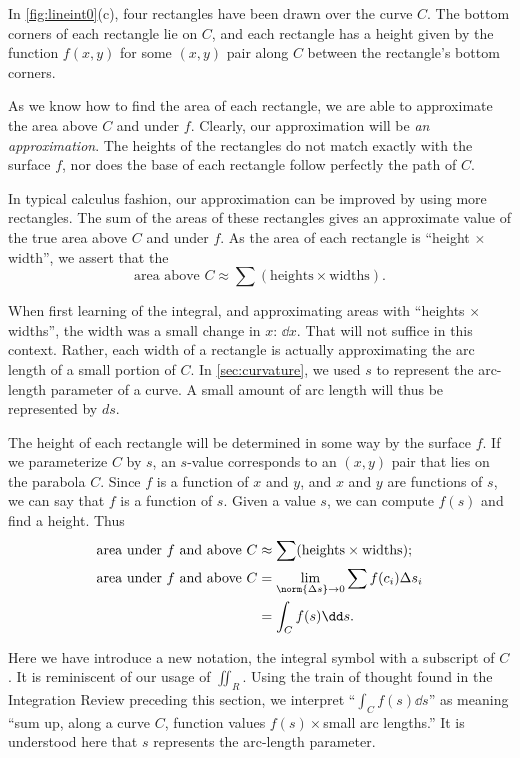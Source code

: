 In \autoref{fig:lineint0}(c), four rectangles have been drawn over the curve $C$. The bottom corners of each rectangle lie on $C$, and each rectangle has a height given by the function $f(x,y)$ for some $(x,y)$ pair along $C$ between the rectangle's bottom corners. 

As we know how to find the area of each rectangle, we are able to approximate the area above $C$ and under $f$. Clearly, our approximation will be \emph{an approximation}. The heights of the rectangles do not match exactly with the surface $f$, nor does the base of each rectangle follow perfectly the path of $C$.

In typical calculus fashion, our approximation can be improved by using more rectangles. The sum of the areas of these rectangles gives an approximate value of the true area above $C$ and under $f$. As the area of each rectangle is ``height $\times$ width'', we assert that the
\[\text{area above $C$}\approx \sum (\text{heights}\times\text{widths}).\]

When first learning of the integral, and approximating areas with ``heights $\times$ widths'', the width was a small change in $x$: $\dd x$. That will not suffice in this context. Rather, each width of a rectangle is actually approximating the arc length of a small portion of $C$. In \autoref{sec:curvature}, we used $s$ to represent the arc-length parameter of a curve. A small amount of arc length will thus be represented by $ds$. 

The height of each rectangle will be determined in some way by the surface $f$. If we parameterize $C$ by $s$, an $s$-value corresponds to an $(x,y)$ pair that lies on the parabola $C$. Since $f$ is a function of $x$ and $y$, and $x$ and $y$ are functions of $s$, we can say that $f$ is a function of $s$. Given a value $s$, we can compute $f(s)$ and find a height. Thus
\begin{align}
	\text{area under $f$ and above $C$}
	&\approx \sum (\text{heights}\times\text{widths});\notag\\
	\text{area under $f$ and above $C$}
	&=\lim_{\norm{\Delta s}\to0}\sum f(c_i)\Delta s_i\notag\\
	&=\int_Cf(s)\dd s.\label{eq:line0}
\end{align}

Here we have introduce a new notation, the integral symbol with a subscript of $C$. It is reminiscent of our usage of $\iint_R$. Using the train of thought found in the Integration Review preceding this section, we interpret ``$\int_C f(s)\dd s$'' as meaning ``sum up, along a curve $C$, function values $f(s)\times$small arc lengths.'' It is understood here that $s$ represents the arc-length parameter.

